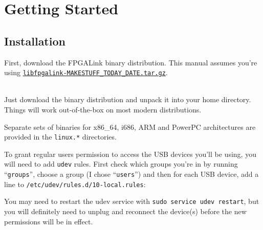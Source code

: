 \newpage
\section{Getting Started}

\subsection{Installation}
First, download the FPGALink binary distribution. This manual assumes you're using \texttt{\href{http://www.swaton.ukfsn.org/bin/libfpgalink-MAKESTUFF_TODAY_DATE.tar.gz}{libfpgalink-MAKESTUFF_TODAY_DATE.tar.gz}}.

\begin{desc}
  \item[\sffamily{Linux:}] \hfill \\
    Just download the binary distribution and unpack it into your home directory. Things will work out-of-the-box on most modern distributions.

    Separate sets of binaries for x86\_64, i686, ARM and PowerPC architectures are provided in the \texttt{linux.*} directories.

    To grant regular users permission to access the USB devices you'll be using, you will need to add \texttt{udev} rules. First check which groups you're in by running ``\texttt{groups}'', choose a group (I chose ``\texttt{users}'') and then for each USB device, add a line to \texttt{/etc/udev/rules.d/10-local.rules}:


    You may need to restart the udev service with \texttt{sudo service udev restart}, but you will definitely need to unplug and reconnect the device(s) before the new permissions will be in effect.


\end{desc}
